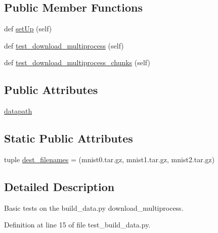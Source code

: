 \subsection*{Public Member Functions}
\begin{DoxyCompactItemize}
\item 
def \hyperlink{classtests_1_1test__build__data_1_1TestBuildData_a778e0feb33f86ce770dc7bf7a3b8a416}{set\+Up} (self)
\item 
def \hyperlink{classtests_1_1test__build__data_1_1TestBuildData_a24ccc6522078dd41dbc5d608bc1297e2}{test\+\_\+download\+\_\+multiprocess} (self)
\item 
def \hyperlink{classtests_1_1test__build__data_1_1TestBuildData_a57a7d34acf8cec7b757605c5659b6e96}{test\+\_\+download\+\_\+multiprocess\+\_\+chunks} (self)
\end{DoxyCompactItemize}
\subsection*{Public Attributes}
\begin{DoxyCompactItemize}
\item 
\hyperlink{classtests_1_1test__build__data_1_1TestBuildData_a4b59ee6d7a834ee32404afe63512db12}{datapath}
\end{DoxyCompactItemize}
\subsection*{Static Public Attributes}
\begin{DoxyCompactItemize}
\item 
tuple \hyperlink{classtests_1_1test__build__data_1_1TestBuildData_ae4a9fc30e48b82a3fce242ea1dfa4b60}{dest\+\_\+filenames} = (\textquotesingle{}mnist0.\+tar.\+gz\textquotesingle{}, \textquotesingle{}mnist1.\+tar.\+gz\textquotesingle{}, \textquotesingle{}mnist2.\+tar.\+gz\textquotesingle{})
\end{DoxyCompactItemize}


\subsection{Detailed Description}
\begin{DoxyVerb}Basic tests on the build_data.py download_multiprocess.
\end{DoxyVerb}
 

Definition at line 15 of file test\+\_\+build\+\_\+data.\+py.



